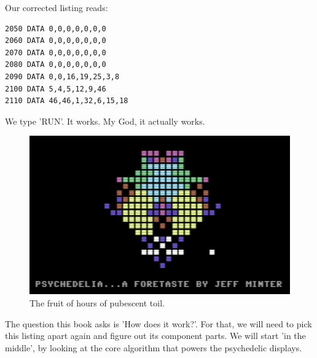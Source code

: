 Our corrected listing reads:
\lstset{style=C64BasicStyle}
\begin{lstlisting}
2050 DATA 0,0,0,0,0,0,0 
2060 DATA 0,0,0,0,0,0,0
2070 DATA 0,0,0,0,0,0,0 
2080 DATA 0,0,0,0,0,0,0
2090 DATA 0,0,16,19,25,3,8 
2100 DATA 5,4,5,12,9,46
2110 DATA 46,46,1,32,6,15,18
\end{lstlisting}

We type 'RUN'. It works. My God, it actually works. 
\begin{figure}[H]
    \centering
    \begin{adjustbox}{width=12cm,center}
      \includegraphics[width=12cm]{src/listing/itworks.png}%
    \end{adjustbox}
  \caption{The fruit of hours of pubescent toil.}
\end{figure}

The question this book asks is 'How does it work?'. For that, we will
need to pick this listing apart again and figure out its component parts. We will start 'in the middle', by looking at the
core algorithm that powers the psychedelic displays.

